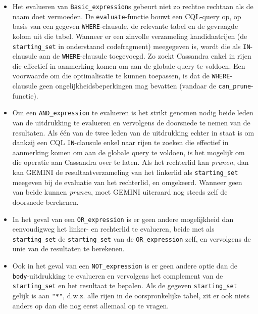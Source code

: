 \begin{itemize}
\item Het evalueren van \texttt{Basic\_expression}s gebeurt niet zo rechtoe rechtaan als de naam doet vermoeden. De \texttt{evaluate}-functie bouwt een CQL-query op, op basis van een gegeven \texttt{WHERE}-clausule, de relevante tabel en de gevraagde kolom uit die tabel. Wanneer er een zinvolle verzameling kandidaatrijen (de \texttt{starting\_set} in onderstaand codefragment) meegegeven is, wordt die als \texttt{IN}-clausule aan de \texttt{WHERE}-clausule toegevoegd. Zo zoekt Cassandra enkel in rijen die effectief in aanmerking komen om aan de globale query te voldoen. Een voorwaarde om die optimalisatie te kunnen toepassen, is dat de \texttt{WHERE}-clausule geen ongelijkheidsbeperkingen mag bevatten (vandaar de \texttt{can\_prune}-functie).



\item Om een \texttt{AND\_expression} te evalueren is het strikt genomen nodig beide leden van de uitdrukking te evalueren en vervolgens de doorsnede te nemen van de resultaten. Als \'e\'en van de twee leden van de uitdrukking echter in staat is om dankzij een CQL \texttt{IN}-clausule enkel naar rijen te zoeken die effectief in aanmerking komen om aan de globale query te voldoen, is het mogelijk om die operatie aan Cassandra over te laten. Als het rechterlid kan \textit{prunen}, dan kan GEMINI de resultaatverzameling van het linkerlid als \texttt{starting\_set} meegeven bij de evaluatie van het rechterlid, en omgekeerd. Wanneer geen van beide kunnen \textit{prunen}, moet GEMINI uiteraard nog steeds zelf de doorsnede berekenen.



\item In het geval van een \texttt{OR\_expression} is er geen andere mogelijkheid dan eenvoudigweg het linker- en rechterlid te evalueren, beide met als \texttt{starting\_set} de \texttt{starting\_set} van de \texttt{OR\_expression} zelf, en vervolgens de unie van de resultaten te berekenen.

\item Ook in het geval van een \texttt{NOT\_expression} is er geen andere optie dan de \texttt{body}-uitdrukking te evalueren en vervolgens het complement van de \texttt{starting\_set} en het resultaat te bepalen. Als de gegeven \texttt{starting\_set} gelijk is aan \texttt{"*"}, d.w.z. alle rijen in de oorspronkelijke tabel, zit er ook niets anders op dan die nog eerst allemaal op te vragen.



\end{itemize}

